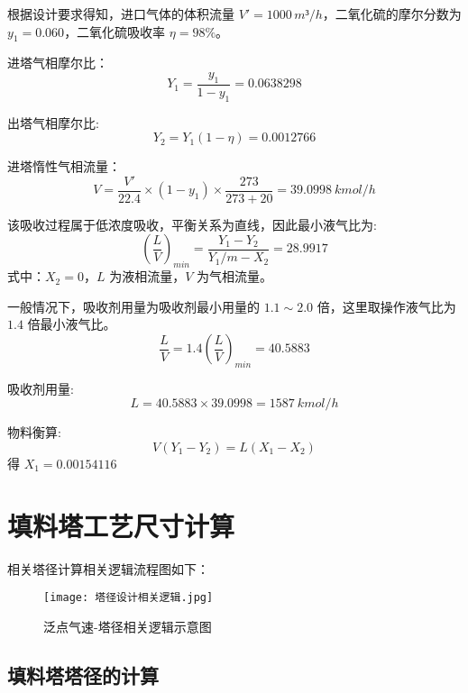 根据设计要求得知，进口气体的体积流量 $V'=1000 \, m³/h$，二氧化硫的摩尔分数为 $y_1=0.060$，二氧化硫吸收率 $η=98\%$。

进塔气相摩尔比：
\begin{equation}
	Y_1 = \frac{y_1}{1-y_1} = 0.0638298
\end{equation}

出塔气相摩尔比:
\begin{equation}
	Y_2 = Y_1(1-η) = 0.0012766
\end{equation}

进塔惰性气相流量：
\begin{equation}
	V = \frac{V'}{22.4} \times (1-y_1) \times \frac{273}{273+20} = 39.0998 \: kmol/h
\end{equation}

该吸收过程属于低浓度吸收，平衡关系为直线，因此最小液气比为:
\begin{equation}
	\left(\frac{L}{V}\right)_{min} = \frac{Y_1 - Y_2}{Y_1/m - X_2} = 28.9917
\end{equation}
式中：$X_2=0$，$L$ 为液相流量，$V$ 为气相流量。

一般情况下，吸收剂用量为吸收剂最小用量的 $1.1 \sim 2.0$ 倍，这里取操作液气比为 $1.4$ 倍最小液气比。
\begin{equation}
	\frac{L}{V} = 1.4 \left(\frac{L}{V}\right)_{min} = 40.5883
\end{equation}

吸收剂用量:
\begin{equation}
	L = 40.5883 \times 39.0998 = 1587 \: kmol/h
\end{equation}

物料衡算:
\begin{equation}
	V(Y_1-Y_2) = L(X_1-X_2)
\end{equation}
得 $X_1 = 0.00154116$



\section{填料塔工艺尺寸计算}

相关塔径计算相关逻辑流程图如下：
\begin{figure}[h]
	\centering
	\texttt{[image: 塔径设计相关逻辑.jpg]}
	\captionsetup{skip=2pt} %
	\caption{泛点气速-塔径相关逻辑示意图}
\end{figure}

\subsection{填料塔塔径的计算}

